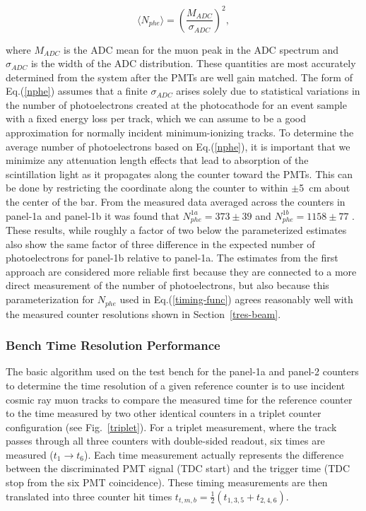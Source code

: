 \documentclass{elsart}
\begin{document}
\begin{equation}
\label{nphe}
\langle N_{phe} \rangle = \left( \frac{M_{ADC}}{\sigma_{ADC}} \right)^2,
\end{equation}

\noindent
where $M_{ADC}$ is the ADC mean for the muon peak in the ADC spectrum and $\sigma_{ADC}$ is the width
of the ADC distribution. These quantities are most accurately determined from the system after the PMTs
are well gain matched. The form of Eq.(\ref{nphe}) assumes that a finite $\sigma_{ADC}$ arises solely due to
statistical variations in the number of photoelectrons created at the photocathode for an event sample with
a fixed energy loss per track, which we can assume to be a good approximation for normally incident
minimum-ionizing tracks. To determine the average number of photoelectrons based on Eq.(\ref{nphe}), it is
important that we minimize any attenuation length effects that lead to absorption of the scintillation light as
it propagates along the counter toward the PMTs. This can be done by restricting the coordinate along the
counter to within $\pm$5~cm about the center of the bar. From the measured data averaged across the
counters in panel-1a and panel-1b it was found that $N_{phe}^{1a} = 373 \pm 39$ and $N_{phe}^{1b} = 1158 \pm 77$
\cite{pmt-currents}. These results, while roughly a factor of two below the parameterized estimates also show
the same factor of three difference in the expected number of photoelectrons for panel-1b relative to panel-1a.
The estimates from the first approach are considered more reliable first because they are connected to a more
direct measurement of the number of photoelectrons, but also because this parameterization for $N_{phe}$
used in Eq.(\ref{timing-func}) agrees reasonably well with the measured counter resolutions shown in
Section~\ref{tres-beam}.

\subsubsection{Bench Time Resolution Performance}
\label{sec-bench}

The basic algorithm used on the test bench for the panel-1a and panel-2 counters to determine the time
resolution of a given reference counter is to use incident cosmic ray muon tracks to compare the measured
time for the reference counter to the time measured by two other identical counters in a triplet counter
configuration (see Fig.~\ref{triplet}). For a triplet measurement, where the track passes through all three
counters with double-sided readout, six times are measured ($t_1 \to t_6$). Each time measurement actually
represents the difference between the discriminated PMT signal (TDC start) and the trigger time (TDC stop
from the six PMT coincidence). These timing measurements are then translated into three counter hit times
$t_{t,m,b} = \frac{1}{2}(t_{1,3,5} + t_{2,4,6})$.
\end{document}
